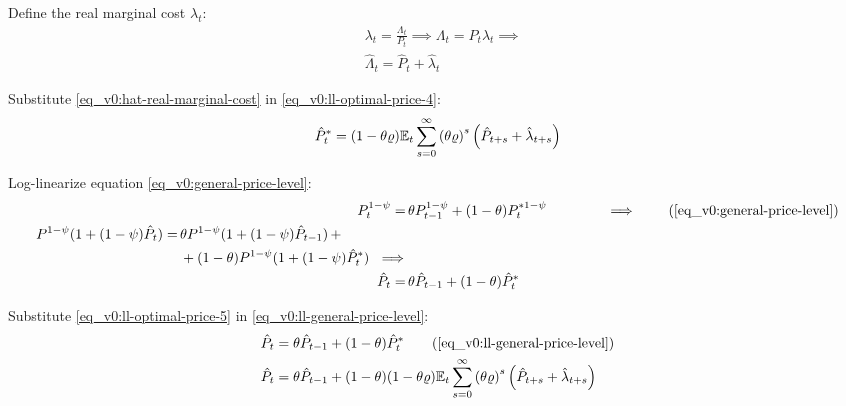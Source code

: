 \documentclass[
thesis.tex
]{subfiles}
\begin{document}
	Define the real marginal cost $\lambda_t$:
	\begin{align}
		& \lambda_t = \frac{\Lambda_t}{P_t} \implies \Lambda_t = P_t \lambda_t \implies \nonumber \\
		& \hat{\Lambda}_t = \hat{P}_t + \hat{\lambda}_t \label{eq_v0:hat-real-marginal-cost}
	\end{align}
	
	Substitute \ref{eq_v0:hat-real-marginal-cost} in \ref{eq_v0:ll-optimal-price-4}:
	\begin{align}
		\hat{P}_t^\ast = (1- \theta \varrho) {\mathbb{E}_{t}} \sum_{s=0}^{\infty} \left( \theta \varrho \right)^s \left( \hat{P}_{t+s} + \hat{\lambda}_{t+s} \right) \label{eq_v0:ll-optimal-price-5}
	\end{align}
	
	Log-linearize equation \ref{eq_v0:general-price-level}:
	\begin{align}
		P_t^{1-\psi} =\, &\theta P_{t-1}^{1-\psi} + (1-\theta) P_t^{\ast 1-\psi} \qquad \qquad \implies \tag{\ref{eq_v0:general-price-level}} \\
		\begin{split} P^{1-\psi} (1 + (1-\psi)\hat{P}_t) =\, &\theta P^{1-\psi} (1 + (1-\psi)\hat{P}_{t-1}) \, + \\ & + (1-\theta) P^{1-\psi} (1 + (1-\psi)\hat{P}_t^\ast) \ \implies \nonumber \end{split} \\
		\hat{P}_t =\, &\theta \hat{P}_{t-1} + (1-\theta) \hat{P}_t^\ast
		\label{eq_v0:ll-general-price-level}
	\end{align}
	
	Substitute \ref{eq_v0:ll-optimal-price-5} in \ref{eq_v0:ll-general-price-level}:
	\begin{align}
		\hat{P}_t &= \theta \hat{P}_{t-1} + (1-\theta) \hat{P}_t^\ast \tag{\ref{eq_v0:ll-general-price-level}}\\
		\hat{P}_t &= \theta \hat{P}_{t-1} + (1-\theta) (1- \theta \varrho) \E \sum_{s=0}^{\infty} \left( \theta \varrho \right)^s \left( \hat{P}_{t+s} + \hat{\lambda}_{t+s} \right) \label{eq_v0:ll-general-price-level-2}
	\end{align}
	
\end{document}
